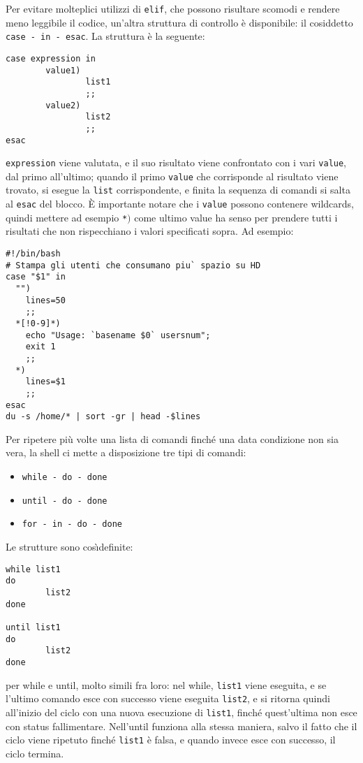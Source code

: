 \medskip
Per evitare molteplici utilizzi di \texttt{elif}, che possono risultare
scomodi e rendere meno leggibile il codice, un'altra struttura di controllo
\`e disponibile: il cosiddetto \texttt{case - in - esac}. La struttura \`e la
seguente:
\begin{verbatim}
case expression in
        value1)
                list1
                ;;
        value2)
                list2
                ;;
esac
\end{verbatim}
\texttt{expression} viene valutata, e il suo risultato viene confrontato con i
vari \texttt{value}, dal primo all'ultimo; quando il primo \texttt{value} che
corrisponde al risultato viene trovato, si esegue la \texttt{list}
corrispondente, e finita la sequenza di comandi si salta al \texttt{esac} del
blocco. \`E importante notare che i \texttt{value} possono contenere
wildcards, quindi mettere ad esempio \texttt{*$)$} come ultimo value ha senso
per prendere tutti i risultati che non rispecchiano i valori specificati
sopra.
Ad esempio:
\begin{verbatim}
#!/bin/bash
# Stampa gli utenti che consumano piu` spazio su HD
case "$1" in
  "")
    lines=50
    ;;
  *[!0-9]*)
    echo "Usage: `basename $0` usersnum";
    exit 1
    ;;
  *)
    lines=$1
    ;;
esac
du -s /home/* | sort -gr | head -$lines
\end{verbatim}

\medskip
Per ripetere pi\`u volte una lista di comandi finch\'e una data condizione non
sia vera, la shell ci mette a disposizione tre tipi di comandi:
\begin{itemize}
	\item \texttt{while - do - done}
	\item \texttt{until - do - done}
	\item \texttt{for - in - do - done}
\end{itemize}
Le strutture sono cos\`\i definite:
\begin{verbatim}
while list1
do
        list2
done

until list1
do
        list2
done
\end{verbatim}
per while e until, molto simili fra loro: nel while, \texttt{list1} viene
eseguita, e se l'ultimo comando esce con successo viene eseguita
\texttt{list2}, e si ritorna quindi all'inizio del ciclo con una nuova
esecuzione di \texttt{list1}, finch\'e quest'ultima non esce con status
fallimentare. Nell'until funziona alla stessa maniera, salvo il fatto che il
ciclo viene ripetuto finch\'e \texttt{list1} \`e falsa, e quando invece esce
con successo, il ciclo termina.

